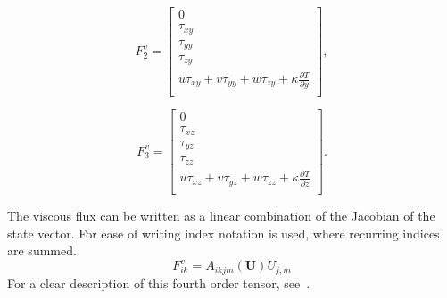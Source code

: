 \documentclass{report}
\newcommand{\dy}[1]{\frac{\partial #1}{\partial y}}
\newcommand{\dz}[1]{\frac{\partial #1}{\partial z}}
\begin{document}
\begin{equation*}
{F}_{2}^v =
\left[
\begin{array}{c}
0		\\
\tau_{xy}	 	\\
\tau_{yy}		\\
\tau_{zy}		\\
u\tau_{xy} + v\tau_{yy} + w\tau_{zy} + \kappa\dy{T}	\\
\end{array}
\right],
\end{equation*}

\begin{equation*}
{F}_{3}^v =
\left[
\begin{array}{c}
0		\\
\tau_{xz}	 	\\
\tau_{yz}		\\
\tau_{zz}		\\
u\tau_{xz} + v\tau_{yz} + w\tau_{zz} + \kappa\dz{T}	\\
\end{array}
\right].
\end{equation*}

The viscous flux can be written as a linear combination of the Jacobian of the state vector. For ease of writing index notation is used, where recurring indices are summed. 
\begin{equation}
\label{e:Atensor}
F^v_{ik} = A_{ikjm}(\mathbf{U})U_{j,m}
\end{equation}
For a clear description of this fourth order tensor, see~\cite{}.
\end{document}
